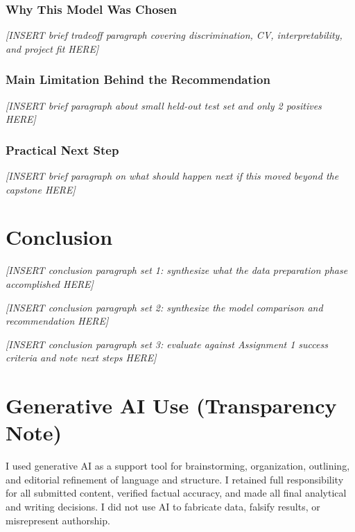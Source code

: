 \documentclass[12pt]{article}
\newcommand{\placeholder}[1]{\textit{[INSERT #1 HERE]}}
\begin{document}
\subsubsection*{Why This Model Was Chosen}
\placeholder{brief tradeoff paragraph covering discrimination, CV, interpretability, and project fit}

\subsubsection*{Main Limitation Behind the Recommendation}
\placeholder{brief paragraph about small held-out test set and only 2 positives}

\subsubsection*{Practical Next Step}
\placeholder{brief paragraph on what should happen next if this moved beyond the capstone}

\section*{Conclusion}
\label{sec:conclusion}

%
%

\placeholder{conclusion paragraph set 1: synthesize what the data preparation phase accomplished}

\placeholder{conclusion paragraph set 2: synthesize the model comparison and recommendation}

\placeholder{conclusion paragraph set 3: evaluate against Assignment 1 success criteria and note next steps}

\section*{Generative AI Use (Transparency Note)}

I used generative AI as a support tool for brainstorming, organization, outlining, and editorial refinement of language and structure. I retained full responsibility for all submitted content, verified factual accuracy, and made all final analytical and writing decisions. I did not use AI to fabricate data, falsify results, or misrepresent authorship.
\end{document}
